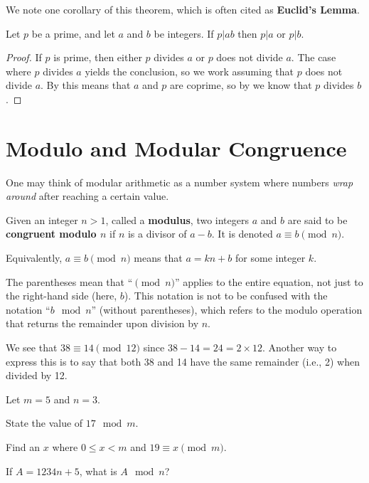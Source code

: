 We note one corollary of this theorem, which is often cited as \textbf{Euclid's Lemma}.

\begin{corollary}\label{corollary-euclid}
    Let $p$ be a prime, and let $a$ and $b$ be integers. If $p \vert ab$ then $p \vert a$ or $p \vert b$.
\end{corollary}
\begin{proof}
    If $p$ is prime, then either $p$ divides $a$ or $p$ does not divide $a$. The case where $p$ divides $a$ yields the conclusion, so we work assuming that $p$ does not divide $a$. By  this means that $a$ and $p$ are coprime, so by  we know that $p$ divides $b$.
\end{proof}

\section{Modulo and Modular Congruence}
One may think of modular arithmetic as a number system where numbers \textit{wrap around} after reaching a certain value.

\begin{definition}
    Given an integer $n>1$, called a \textbf{modulus}, two integers $a$ and $b$ are said to be \textbf{congruent modulo $n$} if $n$ is a divisor of $a - b$. It is denoted $a \equiv b \pmod{n}$.
\end{definition}
\begin{remark}
    Equivalently, $a \equiv b \pmod n$ means that $a = kn + b$ for some integer $k$.
\end{remark}
\begin{remark}
    The parentheses mean that ``$\pmod{n}$'' applies to the entire equation, not just to the right-hand side (here, $b$). This notation is not to be confused with the notation ``$b \mod n$'' (without parentheses), which refers to the modulo operation that returns the remainder upon division by $n$.
\end{remark}
\begin{example}
    We see that $38 \equiv 14 \pmod{12}$ since $38 - 14 = 24 = 2 \times 12$. Another way to express this is to say that both 38 and 14 have the same remainder (i.e., 2) when divided by 12.
\end{example}

\begin{exercise}
    Let $m = 5$ and $n = 3$.
    \begin{partquestions}{\alph*}
        \item State the value of $17 \mod m$.
        \item Find an $x$ where $0 \leq x < m$ and $19 \equiv x \pmod m$.
        \item If $A = 1234n + 5$, what is $A \mod n$?
    \end{partquestions}
\end{exercise}

